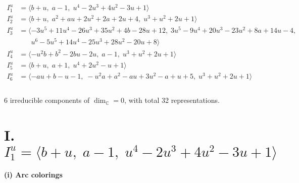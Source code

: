 \documentclass[1p]{elsarticle_modified}
\theoremstyle{definition}
\begin{document}
\begin{align*}
I^u_{1}&=\langle 
b+u,\;a-1,\;u^4-2 u^3+4 u^2-3 u+1\rangle \\
I^u_{2}&=\langle 
b+u,\;a^2+a u+2 u^2+2 a+2 u+4,\;u^3+u^2+2 u+1\rangle \\
I^u_{3}&=\langle 
-3 u^5+11 u^4-26 u^3+35 u^2+4 b-28 u+12,\;3 u^5-9 u^4+20 u^3-23 u^2+8 a+14 u-4,\\
\phantom{I^u_{3}}&\phantom{= \langle  }u^6-5 u^5+14 u^4-25 u^3+28 u^2-20 u+8\rangle \\
I^u_{4}&=\langle 
- u^2 b+b^2-2 b u-2 u,\;a-1,\;u^3+u^2+2 u+1\rangle \\
I^u_{5}&=\langle 
b+u,\;a+1,\;u^4+2 u^2- u+1\rangle \\
I^u_{6}&=\langle 
- a u+b- u-1,\;- u^2 a+a^2- a u+3 u^2- a+u+5,\;u^3+u^2+2 u+1\rangle \\
\\
\end{align*}
\raggedright * 6 irreducible components of $\dim_{\mathbb{C}}=0$, with total 32 representations.\\
\newpage
\renewcommand{\arraystretch}{1}
\centering \section*{I. $I^u_{1}= \langle b+u,\;a-1,\;u^4-2 u^3+4 u^2-3 u+1 \rangle$}
\flushleft \textbf{(i) Arc colorings}\\
\end{document}

